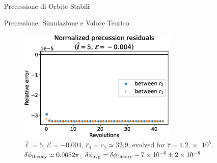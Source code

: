 \begin{frame}{Precessione di Orbite Stabili}
    \centering
\end{frame}


\begin{frame}{Precessione: Simulazione e Valore Teorico}
    \begin{figure}[h]
        \centering
        \includegraphics[width=0.7\textwidth]{Figures/ch2/prec1_res.eps}
        \caption{$\hat \ell = 5$, $\mathcal E = -0.004$, $\hat r_0 = r_1
        \simeq 32.9$, evolved for $\hat \tau = \num{1.2e5}$.
        $\delta \phi_{\rm theory} \simeq 0.0652 \pi$, $\delta \phi_{\rm avg}
        = \delta \phi_{\rm theory} - \num{7e-6} \pm \num{2e-8}$.}
    \end{figure}
\end{frame}



